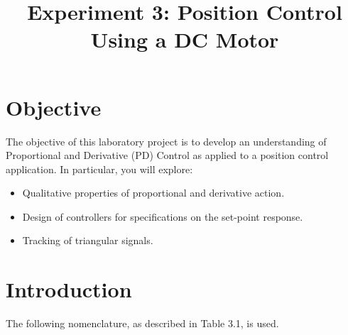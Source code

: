 \documentclass{article}
\title{Experiment 3: Position Control Using a DC Motor}
\date{}
\begin{document}
\maketitle

\section{Objective}
The objective of this laboratory project is to develop an understanding of Proportional and Derivative (PD) Control as applied to a position control application. In particular, you will explore:
\begin{itemize}
    \item Qualitative properties of proportional and derivative action.
    \item Design of controllers for specifications on the set-point response.
    \item Tracking of triangular signals.
\end{itemize}

\section{Introduction}
The following nomenclature, as described in Table 3.1, is used.
\end{document}
